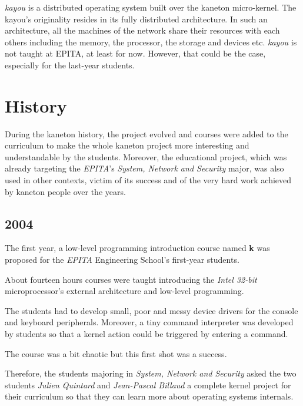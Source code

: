 \begin{multicols}{2}
\textit{kayou} is a distributed operating system built over the kaneton
micro-kernel. The kayou's originality resides in its fully distributed
architecture. In such an architecture, all the machines of the network share
their resources with each others including the memory, the processor, the
storage and devices etc. \textit{kayou} is not taught at EPITA, at least
for now. However, that could be the case, especially for the last-year
students.

%
%

\section{History}

During the kaneton history, the project evolved and courses were added
to the curriculum to make the whole kaneton project more interesting and
understandable by the students. Moreover, the educational project, which
was already targeting the \textit{EPITA}'s \textit{System, Network and
Security} major, was also used in other contexts, victim of its success
and of the very hard work achieved by kaneton people over the years.

%
%

\subsection{2004}

The first year, a low-level programming introduction course named \textbf{k}
was proposed for the \textit{EPITA} Engineering School's first-year students.

About fourteen hours courses were taught introducing the \textit{Intel 32-bit}
microprocessor's external architecture and low-level programming.

The students had to develop small, poor and messy device drivers for the
console and keyboard peripherals. Moreover, a tiny command interpreter was
developed by students so that a kernel action could be triggered by entering
a command.

The course was a bit chaotic but this first shot was a success.

Therefore, the students majoring in \textit{System, Network and Security}
asked the two students \textit{Julien Quintard} and \textit{Jean-Pascal
Billaud} a complete kernel project for their curriculum so that they can
learn more about operating systems internals.


\end{multicols}
